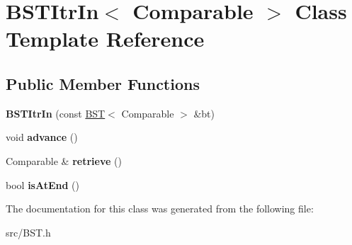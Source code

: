 \hypertarget{singleton_b_s_t_itr_in}{\section{B\+S\+T\+Itr\+In$<$ Comparable $>$ Class Template Reference}
\label{singleton_b_s_t_itr_in}
}
\subsection*{Public Member Functions}
\begin{DoxyCompactItemize}
\item 
\hypertarget{singleton_b_s_t_itr_in_ac836e2f560fed9cc7ef8e5431a2836cc}{{\bfseries B\+S\+T\+Itr\+In} (const \hyperlink{singleton_b_s_t}{B\+S\+T}$<$ Comparable $>$ \&bt)}\label{singleton_b_s_t_itr_in_ac836e2f560fed9cc7ef8e5431a2836cc}

\item 
\hypertarget{singleton_b_s_t_itr_in_ac772d3ebbac748c5f8cf9bc659f2e32c}{void {\bfseries advance} ()}\label{singleton_b_s_t_itr_in_ac772d3ebbac748c5f8cf9bc659f2e32c}

\item 
\hypertarget{singleton_b_s_t_itr_in_ac7ac215c1247bd25fc1fdb8053826a32}{Comparable \& {\bfseries retrieve} ()}\label{singleton_b_s_t_itr_in_ac7ac215c1247bd25fc1fdb8053826a32}

\item 
\hypertarget{singleton_b_s_t_itr_in_a6f9a43217862c263a9bf15b9a08b889a}{bool {\bfseries is\+At\+End} ()}\label{singleton_b_s_t_itr_in_a6f9a43217862c263a9bf15b9a08b889a}

\end{DoxyCompactItemize}


The documentation for this class was generated from the following file\+:\begin{DoxyCompactItemize}
\item 
src/B\+S\+T.\+h\end{DoxyCompactItemize}
